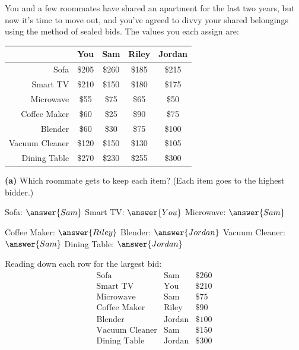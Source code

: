 \documentclass[12pt]{ximera}
\begin{document}
\begin{problem}
You and a few roommates have shared an apartment for the last two years, but now it's
time to move out, and you've agreed to divvy your shared belongings using the method of
sealed bids. The values you each assign are:

\begin{center}
\begin{tabular}{|r|c|c|c|c|}\hline
 & \textbf{You} & \textbf{Sam} & \textbf{Riley} & \textbf{Jordan} \\\hline
Sofa & \$205 & \$260 & \$185 & \$215 \\
Smart TV & \$210 & \$150 & \$180 & \$175 \\
Microwave & \$55 & \$75 & \$65 & \$50 \\
Coffee Maker & \$60 & \$25 & \$90 & \$75 \\
Blender & \$60 & \$30 & \$75 & \$100 \\
Vacuum Cleaner & \$120 & \$150 & \$130 & \$105 \\
Dining Table & \$270 & \$230 & \$255 & \$300 \\\hline
\end{tabular}
\end{center}

\begin{prompt}
\textbf{(a)} Which roommate gets to keep each item? (Each item goes to the highest
bidder.)

Sofa: $\answer{Sam}$ \quad Smart TV: $\answer{You}$ \quad Microwave: $\answer{Sam}$

\smallskip
Coffee Maker: $\answer{Riley}$ \quad Blender: $\answer{Jordan}$ \quad
Vacuum Cleaner: $\answer{Sam}$ \quad Dining Table: $\answer{Jordan}$

\begin{feedback}
Reading down each row for the largest bid:
\[
\begin{array}{lll}
\text{Sofa} & \text{Sam} & \$260\\
\text{Smart TV} & \text{You} & \$210\\
\text{Microwave} & \text{Sam} & \$75\\
\text{Coffee Maker} & \text{Riley} & \$90\\
\text{Blender} & \text{Jordan} & \$100\\
\text{Vacuum Cleaner} & \text{Sam} & \$150\\
\text{Dining Table} & \text{Jordan} & \$300
\end{array}
\]
\end{feedback}
\end{prompt}


\end{problem}
\end{document}
